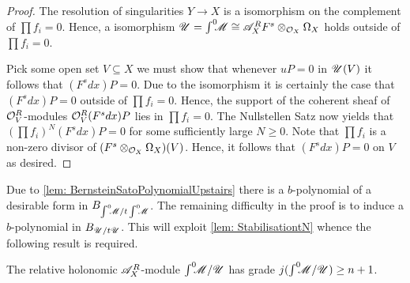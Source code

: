\begin{proof}
   The resolution of singularities $Y\to X$ is a isomorphism on the complement of $\prod f_i = 0$. Hence, a isomorphism $\mathscr{U} = \int^0 \mkern -8mu \mathscr{M} \cong  \mathscr{A}_X^RF^s  \otimes_{\mathcal{O}_X}\Omega_X$ holds outside of $\prod f_i = 0$.

  Pick some open set $V\subseteq X$ we must show that whenever $uP = 0$ in $\mathscr{U}(V)$ it follows that $(F^s dx)P = 0$.
  Due to the isomorphism it is certainly the case that $(F^s dx) P = 0$ outside of $\prod f_i = 0$.
  Hence, the support of the coherent sheaf of $\mathcal{O}_V^R$-modules $\mathcal{O}_V^R (F^s dx) P $ lies in $\prod f_i = 0$.
  The Nullstellen Satz now yields that $(\prod f_i)^N (F^s dx) P  = 0$ for some sufficiently large $N\geq 0$.
  Note that $\prod f_i$ is a non-zero divisor of $(F^s\otimes_{\mathcal{O}_X} \Omega_X)(V)$. Hence, it follows that $(F^s dx) P= 0$ on $V$ as desired.
\end{proof}
Due to  \cref{lem: BernsteinSatoPolynomialUpstairs} there is a $b$-polynomial of a desirable form in $B_{\int^0 \mkern -8mu \mathscr{M}/t\int^0 \mkern -8mu\mathscr{M}}$.
The remaining difficulty in the proof is to induce a $b$-polynomial in $B_{\mathscr{U}/t\mathscr{U}}$. This will exploit \cref{lem: StabilisationtN} whence the following result is required.
\begin{lemma}
  The relative holonomic $\mathscr{A}_X^R$-module $\int^0 \mkern -8mu\mathscr{M}/\mathscr{U}$ has grade $j(\int^0 \mkern -8mu\mathscr{M}/\mathscr{U})\geq n+1$.
\end{lemma}
